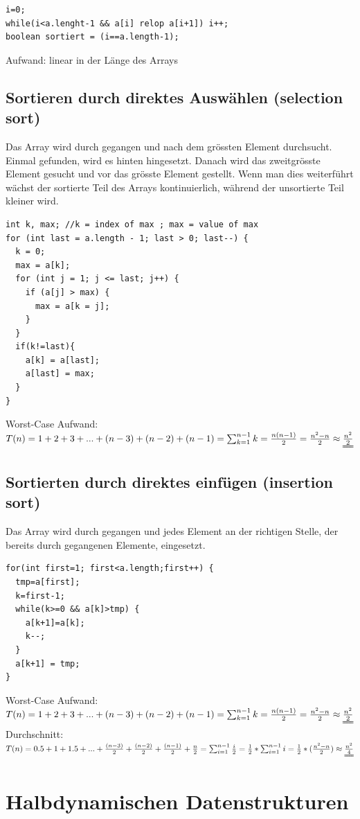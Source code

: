 \documentclass[a4paper,10pt]{article}
\begin{document}
\begin{lstlisting}
i=0;
while(i<a.lenght-1 && a[i] relop a[i+1]) i++;
boolean sortiert = (i==a.length-1);
\end{lstlisting}
Aufwand: linear in der L\"ange des Arrays \\

\subsection{Sortieren durch direktes Ausw\"ahlen (selection sort)}
Das Array wird durch gegangen und nach dem gr\"ossten Element durchsucht. Einmal gefunden, wird es hinten hingesetzt. Danach wird das zweitgr\"osste Element gesucht und vor das gr\"osste Element gestellt. Wenn man dies weiterf\"uhrt w\"achst der sortierte Teil des Arrays kontinuierlich, w\"ahrend der unsortierte Teil kleiner wird.
\begin{lstlisting}
int k, max; //k = index of max ; max = value of max
for (int last = a.length - 1; last > 0; last--) {
  k = 0;
  max = a[k];
  for (int j = 1; j <= last; j++) {
    if (a[j] > max) {
      max = a[k = j];
    }
  }
  if(k!=last){
    a[k] = a[last];
    a[last] = max;
  }
}
\end{lstlisting}
Worst-Case Aufwand: $T(n)=1+2+3+...+(n-3)+(n-2)+(n-1)=\sum^{n-1}_{k=1} k=\frac{n(n-1)}{2}=\frac{n^2-n}{2}\approx\uuline{\frac{n^2}{2}}$

\subsection{Sortierten durch direktes einf\"ugen (insertion sort)}
Das Array wird durch gegangen und jedes Element an der richtigen Stelle, der bereits durch gegangenen Elemente, eingesetzt.
\begin{lstlisting}
for(int first=1; first<a.length;first++) {
  tmp=a[first];
  k=first-1;
  while(k>=0 && a[k]>tmp) {
    a[k+1]=a[k];
    k--;
  }
  a[k+1] = tmp;
}
\end{lstlisting}
Worst-Case Aufwand: $T(n)=1+2+3+...+(n-3)+(n-2)+(n-1)=\sum^{n-1}_{k=1} k=\frac{n(n-1)}{2}=\frac{n^2-n}{2}\approx\uuline{\frac{n^2}{2}}$
Durchschnitt: $T(n)=0.5 + 1 + 1.5 + ... + \frac{(n-3)}{2} + \frac{(n-2)}{2} + \frac{(n-1)}{2}  + \frac{n}{2}=\sum^{n-1}_{i=1} \frac{i}{2}=\frac{1}{2}*\sum^{n-1}_{i=1} i = \frac{1}{2}*(\frac{n^2-n}{2})\approx\uuline{\frac{n^2}{4}}$

\section{Halbdynamischen Datenstrukturen}
\end{document}
